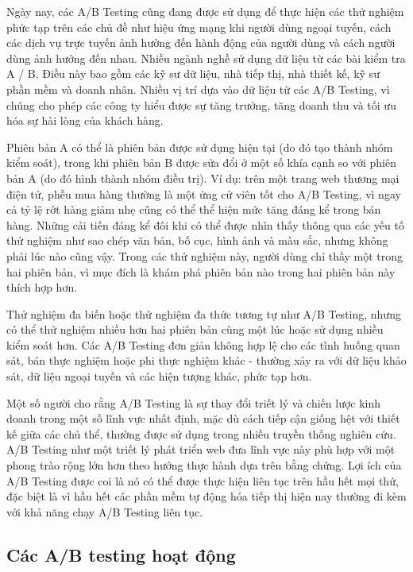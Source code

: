 Ngày nay, các A/B Testing cũng đang được sử dụng để thực hiện các thử nghiệm phức tạp trên các chủ đề như hiệu ứng mạng khi người dùng ngoại tuyến, cách các dịch vụ trực tuyến ảnh hưởng đến hành động của người dùng và cách người dùng ảnh hưởng đến nhau. Nhiều ngành nghề sử dụng dữ liệu từ các bài kiểm tra A / B. Điều này bao gồm các kỹ sư dữ liệu, nhà tiếp thị, nhà thiết kế, kỹ sư phần mềm và doanh nhân. Nhiều vị trí dựa vào dữ liệu từ các A/B Testing, vì chúng cho phép các công ty hiểu được sự tăng trưởng, tăng doanh thu và tối ưu hóa sự hài lòng của khách hàng.

Phiên bản A có thể là phiên bản được sử dụng hiện tại (do đó tạo thành nhóm kiểm soát), trong khi phiên bản B được sửa đổi ở một số khía cạnh so với phiên bản A (do đó hình thành nhóm điều trị). Ví dụ: trên một trang web thương mại điện tử, phễu mua hàng thường là một ứng cử viên tốt cho A/B Testing, vì ngay cả tỷ lệ rớt hàng giảm nhẹ cũng có thể thể hiện mức tăng đáng kể trong bán hàng. Những cải tiến đáng kể đôi khi có thể được nhìn thấy thông qua các yếu tố thử nghiệm như sao chép văn bản, bố cục, hình ảnh và màu sắc, nhưng không phải lúc nào cũng vậy. Trong các thử nghiệm này, người dùng chỉ thấy một trong hai phiên bản, vì mục đích là khám phá phiên bản nào trong hai phiên bản này thích hợp hơn.

Thử nghiệm đa biến hoặc thử nghiệm đa thức tương tự như A/B Testing, nhưng có thể thử nghiệm nhiều hơn hai phiên bản cùng một lúc hoặc sử dụng nhiều kiểm soát hơn. Các A/B Testing đơn giản không hợp lệ cho các tình huống quan sát, bán thực nghiệm hoặc phi thực nghiệm khác - thường xảy ra với dữ liệu khảo sát, dữ liệu ngoại tuyến và các hiện tượng khác, phức tạp hơn.

Một số người cho rằng A/B Testing là sự thay đổi triết lý và chiến lược kinh doanh trong một số lĩnh vực nhất định, mặc dù cách tiếp cận giống hệt với thiết kế giữa các chủ thể, thường được sử dụng trong nhiều truyền thống nghiên cứu. A/B Testing như một triết lý phát triển web đưa lĩnh vực này phù hợp với một phong trào rộng lớn hơn theo hướng thực hành dựa trên bằng chứng. Lợi ích của A/B Testing được coi là nó có thể được thực hiện liên tục trên hầu hết mọi thứ, đặc biệt là vì hầu hết các phần mềm tự động hóa tiếp thị hiện nay thường đi kèm với khả năng chạy A/B Testing liên tục.

\subsection{Các A/B testing hoạt động}

